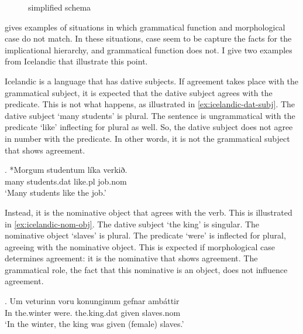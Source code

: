 \begin{figure}[H]
  \centering
  \label{fig:agr-nom-acc-dat}
  \caption{ simplified schema}
\end{figure}

\citeauthor{bobaljik2006} gives examples of situations in which grammatical function and morphological case do not match. In these situations, case seem to be capture the facts for the implicational hierarchy, and grammatical function does not. I give two examples from Icelandic that illustrate this point.

Icelandic is a language that has dative subjects. If agreement takes place with the grammatical subject, it is expected that the dative subject agrees with the predicate. This is not what happens, as illustrated in \ref{ex:icelandic-dat-subj}. The dative subject  `many students' is plural. The sentence is ungrammatical with the predicate  `like' inflecting for plural as well. So, the dative subject does not agree in number with the predicate. In other words, it is not the grammatical subject that shows agreement.

\exg. *Morgum studentum líka verkið.\\
 many students.\ac{dat} like.\ac{pl} job.\ac{nom} \\
`Many students like the job.' \label{ex:icelandic-dat-subj}

Instead, it is the nominative object that agrees with the verb. This is illustrated in \ref{ex:icelandic-nom-obj}. The dative subject  `the king' is singular. The nominative object  `slaves' is plural. The predicate  `were' is inflected for plural, agreeing with the nominative object. This is expected if morphological case determines agreement: it is the nominative that shows agreement. The grammatical role, the fact that this nominative is an object, does not influence agreement.

\exg. Um veturinn voru konunginum gefnar ambáttir\\
In the.winter were. the.king.\ac{dat} given slaves.\ac{nom}\\
`In the winter, the king was given (female) slaves.' \label{ex:icelandic-nom-obj}


